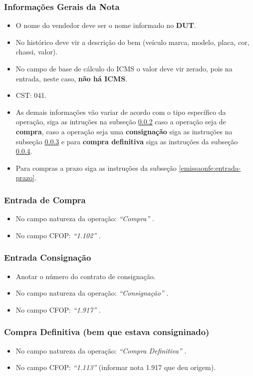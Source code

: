 \documentclass{article}
\newcommand{\itasp}[1]{
  \textit{``#1''}
}
\begin{document}
\subsubsection{Informações Gerais da Nota}
\begin{itemize}
  \item O nome do vendedor deve ser o nome informado no \textbf{DUT}.
  \item No histórico deve vir a descrição do bem (veículo marca, modelo, placa, cor, chassi, valor).
  \item No campo de base de cálculo do ICMS o valor deve vir zerado, pois na entrada, neste caso, \textbf{não há ICMS}.
  \item CST: 041.
  \item As demais informações vão variar de acordo com o tipo específico da operação, siga as intruções na subseção \ref{emissaonfe:entrada-compra} caso a operação seja de \textbf{compra}, caso a operação seja uma \textbf{consignação} siga as instruções na subseção \ref{emissaonfe:entrada-consig} e para \textbf{compra definitiva} siga as instruções da subseção \ref{emissaonfe:entrada-definitiva}.
  \item Para compras a prazo siga as instruções da subseção \ref{emissaonfe:entrada-prazo}.
\end{itemize}
\subsubsection{Entrada de Compra}
\label{emissaonfe:entrada-compra}
\begin{itemize}
  \item No campo natureza da operação: \itasp{Compra}.
  \item No campo CFOP: \itasp{1.102}.
\end{itemize}
\subsubsection{Entrada Consignação}
\label{emissaonfe:entrada-consig}
\begin{itemize}
  \item Anotar o número do contrato de consignação.
  \item No campo natureza da operação: \itasp{Consignação}.
  \item No campo CFOP: \itasp{1.917}.
\end{itemize}
\subsubsection{Compra Definitiva (bem que estava consigninado)}
\label{emissaonfe:entrada-definitiva}
\begin{itemize}
  \item No campo natureza da operação: \itasp{Compra Definitiva}.
  \item No campo CFOP: \itasp{1.113} (informar nota 1.917 que deu origem).
\end{itemize}
\end{document}
